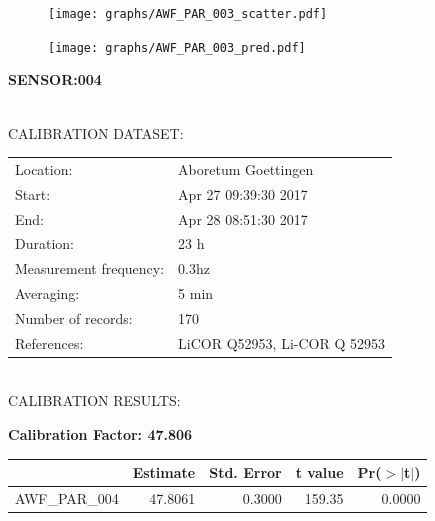 \documentclass[oneside]{report}
\begin{document}
\begin{figure}[H]
  \centering
  \texttt{[image: graphs/AWF\_PAR\_003\_scatter.pdf]}
\end{figure}




\begin{figure}[H]
  \centering
  \texttt{[image: graphs/AWF\_PAR\_003\_pred.pdf]}
\end{figure}

\pagebreak


\begin{center}
\large{\textbf{SENSOR:004}}\\
\end{center}

\hrulefill\\
CALIBRATION DATASET:\\
\begin{table}[h!]
  \centering
  \label{tab:table1}
  \begin{tabular}{ll}
    Location: & Aboretum Goettingen\\ 
    
    
    Start:  & Apr 27 09:39:30 2017 \\
    End:   & Apr 28 08:51:30 2017\\ 
    Duration: & 23 h\\
    Measurement frequency: & 0.3hz\\
    Averaging:  &5 min\\
    Number of records: & 170 \\
    References: & LiCOR Q52953, Li-COR Q 52953 \\
  \end{tabular}
\end{table}

\hrulefill\\
CALIBRATION RESULTS:\\


\begin{center}
\textbf{\large{Calibration Factor: 47.806}}\\
\end{center}
\begin{table}[ht]
\centering
\begin{tabular}{rrrrr}
  \hline
 & Estimate & Std. Error & t value & Pr($>$$|$t$|$) \\ 
  \hline
AWF\_PAR\_004 & 47.8061 & 0.3000 & 159.35 & 0.0000 \\ 
   \hline
\end{tabular}
\end{table}
\end{document}
